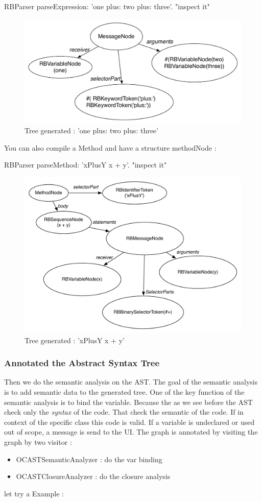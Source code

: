 \documentclass[a4paper,10pt,twoside]{book}
\begin{document}
\begin{code}{}
RBParser parseExpression: 'one plus: two plus: three'.
"inspect it"
\end{code}
\begin{figure}[ht]\centering
	\includegraphics[width=0.7\linewidth]{SimpleMultiExpression}
	\caption{Tree generated :  'one plus: two plus: three' }
\end{figure}

You can also compile a Method and have a structure methodNode :
\begin{code}{}
RBParser parseMethod: 'xPlusY x + y'.
"inspect it"
\end{code}
\begin{figure}[ht]\centering
	\includegraphics[width=0.7\linewidth]{ASTbeforeSemanticAnalysis}
	\caption{Tree generated :  'xPlusY x + y' }
\end{figure}


\subsubsection{Annotated the Abstract Syntax Tree}
Then we do the semantic analysis on the AST. The goal of the semantic analysis is to add semantic data to the generated tree. One of the key function of the semantic analysis is to bind the variable. Because the as we see before the AST check only the \emph{syntax} of the code. That check the semantic of the code. If in context of the specific class this code is valid. If a variable is undeclared or used out of scope, a message is send to the UI. 
The graph is annotated by visiting the graph by two visitor :
\begin{itemize}
\item OCASTSemanticAnalyzer : do the var binding
\item OCASTClosureAnalyzer : do the closure analysis
\end{itemize}
let try a Example :
\end{document}
